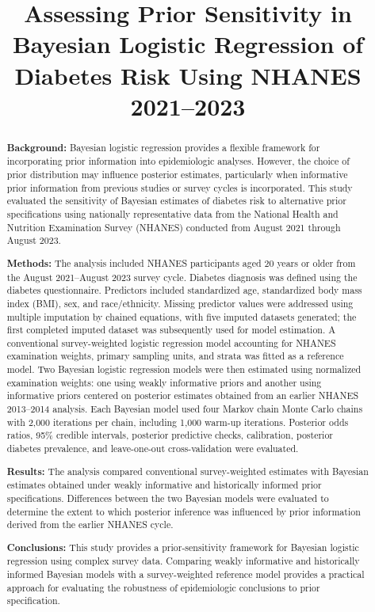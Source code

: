 \documentclass[12pt]{article}
\title{\textbf{Assessing Prior Sensitivity in Bayesian Logistic Regression of Diabetes Risk Using NHANES 2021--2023}}
\author{}
\date{}
\begin{document}
\maketitle


\begin{abstract}

\textbf{Background:}
Bayesian logistic regression provides a flexible framework for incorporating prior information into epidemiologic analyses. However, the choice of prior distribution may influence posterior estimates, particularly when informative prior information from previous studies or survey cycles is incorporated. This study evaluated the sensitivity of Bayesian estimates of diabetes risk to alternative prior specifications using nationally representative data from the National Health and Nutrition Examination Survey (NHANES) conducted from August 2021 through August 2023.

\textbf{Methods:}
The analysis included NHANES participants aged 20 years or older from the August 2021--August 2023 survey cycle. Diabetes diagnosis was defined using the diabetes questionnaire. Predictors included standardized age, standardized body mass index (BMI), sex, and race/ethnicity. Missing predictor values were addressed using multiple imputation by chained equations, with five imputed datasets generated; the first completed imputed dataset was subsequently used for model estimation. A conventional survey-weighted logistic regression model accounting for NHANES examination weights, primary sampling units, and strata was fitted as a reference model. Two Bayesian logistic regression models were then estimated using normalized examination weights: one using weakly informative priors and another using informative priors centered on posterior estimates obtained from an earlier NHANES 2013--2014 analysis. Each Bayesian model used four Markov chain Monte Carlo chains with 2,000 iterations per chain, including 1,000 warm-up iterations. Posterior odds ratios, 95\% credible intervals, posterior predictive checks, calibration, posterior diabetes prevalence, and leave-one-out cross-validation were evaluated.

\textbf{Results:}
The analysis compared conventional survey-weighted estimates with Bayesian estimates obtained under weakly informative and historically informed prior specifications. Differences between the two Bayesian models were evaluated to determine the extent to which posterior inference was influenced by prior information derived from the earlier NHANES cycle.

\textbf{Conclusions:}
This study provides a prior-sensitivity framework for Bayesian logistic regression using complex survey data. Comparing weakly informative and historically informed Bayesian models with a survey-weighted reference model provides a practical approach for evaluating the robustness of epidemiologic conclusions to prior specification.

\end{abstract}
\end{document}
